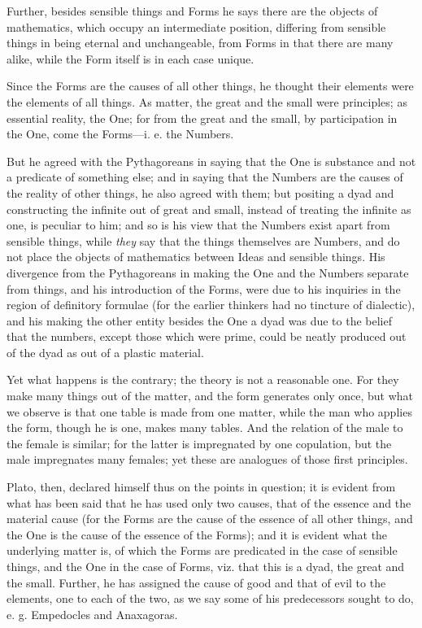 Further, besides sensible things and Forms he says there are the objects of mathematics, which occupy an intermediate position, differing from sensible things in being eternal and unchangeable, from Forms in that there are many alike, while the Form itself is in each case unique.

Since the Forms are the causes of all other things, he thought their elements were the elements of all things. As matter, the great and the small were principles; as essential reality, the One; for from the great and the small, by participation in the One, come the Forms—i. e. the Numbers.

But he agreed with the Pythagoreans in saying that the One is substance and not a predicate of something else; and in saying that the Numbers are the causes of the reality of other things, he also agreed with them; but positing a dyad and constructing the infinite out of great and small, instead of treating the infinite as one, is peculiar to him; and so is his view that the Numbers exist apart from sensible things, while \emph{they} say that the things themselves are Numbers, and do not place the objects of mathematics between Ideas and sensible things. His divergence from the Pythagoreans in making the One and the Numbers separate from things, and his introduction of the Forms, were due to his inquiries in the region of definitory formulae (for the earlier thinkers had no tincture of dialectic), and his making the other entity besides the One a dyad was due to the belief that the numbers, except those which were prime, could be neatly produced out of the dyad as out of a plastic material.

Yet what happens is the contrary; the theory is not a reasonable one. For they make many things out of the matter, and the form generates only once, but what we observe is that one table is made from one matter, while the man who applies the form, though he is one, makes many tables. And the relation of the male to the female is similar; for the latter is impregnated by one copulation, but the male impregnates many females; yet these are analogues of those first principles.

Plato, then, declared himself thus on the points in question; it is evident from what has been said that he has used only two causes, that of the essence and the material cause (for the Forms are the cause of the essence of all other things, and the One is the cause of the essence of the Forms); and it is evident what the underlying matter is, of which the Forms are predicated in the case of sensible things, and the One in the case of Forms, viz. that this is a dyad, the great and the small. Further, he has assigned the cause of good and that of evil to the elements, one to each of the two, as we say some of his predecessors sought to do, e. g. Empedocles and Anaxagoras.

